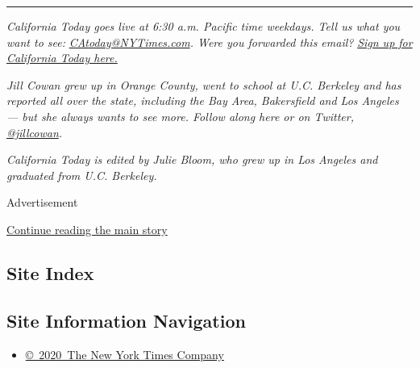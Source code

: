\begin{center}\rule{0.5\linewidth}{\linethickness}\end{center}

\emph{California Today goes live at 6:30 a.m. Pacific time weekdays.
Tell us what you want to see:}
\href{mailto:CAtoday@NYTimes.com}{\emph{CAtoday@NYTimes.com}}\emph{.
Were you forwarded this email?}
\href{https://www.nytimes3xbfgragh.onion/newsletters/california-today?module=inline}{\emph{Sign
up for California Today here.}}

\emph{Jill Cowan grew up in Orange County, went to school at U.C.
Berkeley and has reported all over the state, including the Bay Area,
Bakersfield and Los Angeles --- but she always wants to see more. Follow
along here or on Twitter,}
\href{https://twitter.com/JillCowan}{\emph{@jillcowan}}\emph{.}

\emph{California Today is edited by Julie Bloom, who grew up in Los
Angeles and graduated from U.C. Berkeley.}

Advertisement

\protect\hyperlink{after-bottom}{Continue reading the main story}

\hypertarget{site-index}{%
\subsection{Site Index}\label{site-index}}

\hypertarget{site-information-navigation}{%
\subsection{Site Information
Navigation}\label{site-information-navigation}}

\begin{itemize}
\tightlist
\item
  \href{https://help.nytimes3xbfgragh.onion/hc/en-us/articles/115014792127-Copyright-notice}{©~2020~The
  New York Times Company}
\end{itemize}

